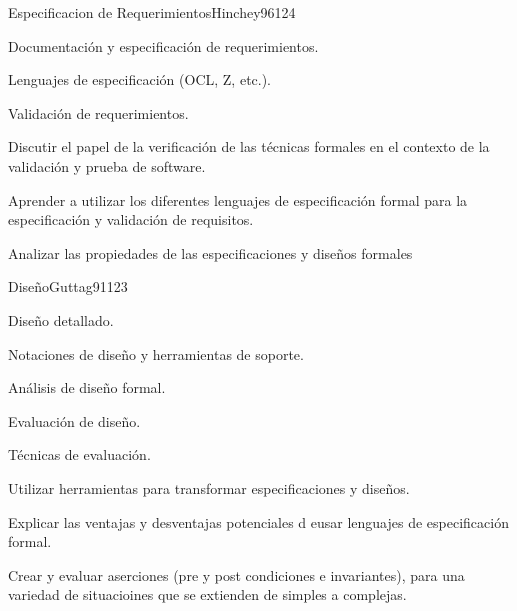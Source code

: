 \begin{syllabus}
\begin{unit}{Especificacion de Requerimientos}{Hinchey96}{12}{4}
   \begin{topics}
      \item Documentación y especificación de requerimientos.
      \begin{inparaenum}
         \item Lenguajes de especificación (OCL, Z, etc.).
      \end{inparaenum}
      \item Validación de requerimientos.
   \end{topics}
   \begin{unitgoals}
      \item Discutir el papel de la verificación de las técnicas formales en el contexto de la validación y prueba de software.
      \item Aprender a utilizar los diferentes lenguajes de especificación formal para la especificación y validación de requisitos.
      \item Analizar las propiedades de las especificaciones y diseños formales
   \end{unitgoals}
\end{unit}

\begin{unit}{Diseño}{Guttag91}{12}{3}
   \begin{topics}
      \item Diseño detallado.
      \item Notaciones de diseño y herramientas de soporte.
      \begin{inparaenum}
         \item Análisis de diseño formal.
      \end{inparaenum}
      \item Evaluación de diseño.
      \begin{inparaenum}
         \item Técnicas de evaluación.
      \end{inparaenum}
   \end{topics}
   \begin{unitgoals}
       \item Utilizar herramientas para transformar especificaciones y diseños.
       \item Explicar las ventajas y desventajas potenciales d eusar lenguajes de especificación formal.
       \item Crear y evaluar aserciones (pre y post condiciones e invariantes), para una variedad de situacioines que se extienden de simples a complejas.
   \end{unitgoals}
\end{unit}


\end{syllabus}
